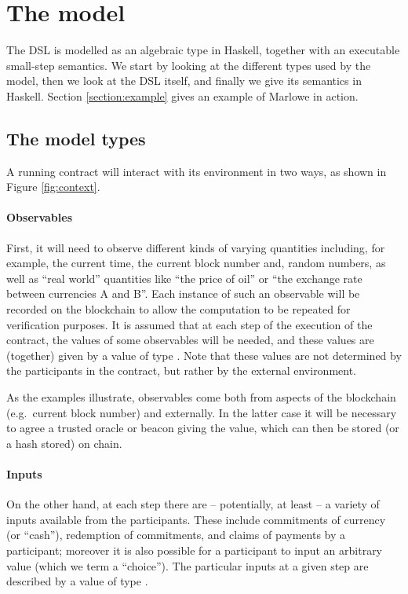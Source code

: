 \documentclass[
      acmsmall
    , screen
    , review=true
  ]{acmart}
\begin{document}
\section{The model}
\label{section:model}

The DSL is modelled as an algebraic type in Haskell, together with an executable small-step semantics. 
We start by looking at the different types used by the model, then we look at the  DSL itself, and finally we give its semantics in Haskell. Section \ref{section:example} gives an example of Marlowe in action.

\subsection{The model types}

A running contract will interact with its environment in two ways, as shown in Figure \ref{fig:context}.

\paragraph{Observables}


First, it will need to observe different kinds of varying quantities including, for example, the current time, the current block number and, random numbers, as well as ``real world'' quantities like ``the price of oil'' or ``the exchange rate between currencies A and B''. Each instance of such an observable will be recorded on the blockchain to allow the computation to be repeated for verification purposes. It is assumed that at each step of the execution of the contract, the values of some observables will be needed, and these values are (together) given by a value of type . Note that these values are not determined by the participants in the contract, but rather by the external environment.

As the examples illustrate, observables come both from aspects of the blockchain (e.g.\ current block number) and externally. In the latter case it will be necessary to agree a trusted oracle or beacon giving the value, which can then be stored (or a hash stored) on chain.

\paragraph{Inputs}


On the other hand, at each step there are -- potentially, at least -- a variety of inputs available from the participants. These include commitments of currency (or ``cash''), redemption of commitments, and claims of payments by a participant; moreover it is also possible for a participant to input an arbitrary value (which we term a ``choice''). The particular inputs at a given step are described by a value of type .
\end{document}
